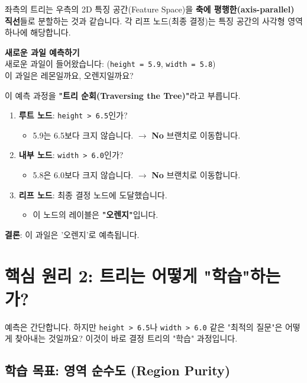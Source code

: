 \documentclass[11pt,a4paper]{book}
\theoremstyle{definition}
\begin{document}
좌측의 트리는 우측의 2D 특징 공간(Feature Space)을 \textbf{축에 평행한(axis-parallel) 직선}들로 분할하는 것과 같습니다.
각 리프 노드(최종 결정)는 특징 공간의 사각형 영역 하나에 해당합니다.

\begin{examplebox}
    \textbf{새로운 과일 예측하기} \\
    새로운 과일이 들어왔습니다: (\texttt{height = 5.9}, \texttt{width = 5.8}) \\
    이 과일은 레몬일까요, 오렌지일까요?

    이 예측 과정을 \textbf{"트리 순회(Traversing the Tree)"}라고 부릅니다.
    \begin{enumerate}
        \item \textbf{루트 노드}: \texttt{height > 6.5}인가?
            \begin{itemize}
                \item 5.9는 6.5보다 크지 않습니다. $\rightarrow$ \textbf{No} 브랜치로 이동합니다.
            \end{itemize}
        \item \textbf{내부 노드}: \texttt{width > 6.0}인가?
            \begin{itemize}
                \item 5.8은 6.0보다 크지 않습니다. $\rightarrow$ \textbf{No} 브랜치로 이동합니다.
            \end{itemize}
        \item \textbf{리프 노드}: 최종 결정 노드에 도달했습니다.
            \begin{itemize}
                \item 이 노드의 레이블은 \textbf{"오렌지"}입니다.
            \end{itemize}
    \end{enumerate}
    \textbf{결론}: 이 과일은 '오렌지'로 예측됩니다.
\end{examplebox}


\section{핵심 원리 2: 트리는 어떻게 "학습"하는가?}

예측은 간단합니다. 하지만 \texttt{height > 6.5}나 \texttt{width > 6.0} 같은 "최적의 질문"은 어떻게 찾아내는 것일까요?
이것이 바로 결정 트리의 "학습" 과정입니다.

\subsection{학습 목표: 영역 순수도 (Region Purity)}
\end{document}
